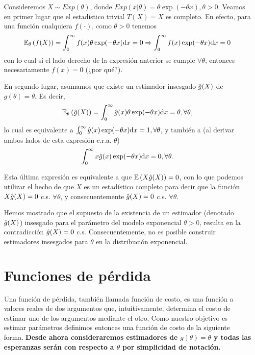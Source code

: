 \begin{example}
	\label{ex:estimador_exponancial}
	Consideremos $X\sim Exp(\theta)$, donde $Exp(x|\theta) = \theta\exp(-\theta x),\theta>0$. Veamos en primer lugar que el estadístico trivial $T(X) = X$ es completo. En efecto, para una función cualquiera $f(\cdot)$, como $\theta>0$ tenemos
	\begin{equation}
	    \mathbb{E}_\theta \left(f(X)\right) = \int_0^\infty f(x)\theta\exp(-\theta x){\text{d}} x = 0 \Rightarrow  \int_0^\infty f(x)\exp(-\theta x){\text{d}} x = 0
	\end{equation}
	con lo cual si el lado derecho de la expresión anterior se cumple  $\forall \theta$, entonces necesariamente $f(x)=0$ (¿por qué?).
	
	En segundo lugar, asumamos que existe un estimador insesgado ${ \hat{g}(X)}$ de $g(\theta) = \theta$. Es decir, 
	\begin{equation}
	\nonumber
		\mathbb{E}_\theta \left({ \hat{g}(X)}\right) = \int_0^\infty { \hat{g}(x)}\theta\exp(-\theta x){\text{d}} x = \theta, \forall \theta,
	\end{equation}
	lo cual es equivalente a $\int_0^\infty { \hat{g}(x)}\exp(-\theta x){\text{d}} x = 1, \forall \theta$, y también a (al derivar ambos lados de esta expresión c.r.a. $\theta$) 
	\begin{equation}
	    \int_0^\infty x{ \hat{g}(x)}\exp(-\theta x){\text{d}} x = 0, \forall \theta.
	\end{equation}

	Esta última expresión es equivalente a que $\mathbb{E} \left(X{ \hat{g}(X)}\right) = 0$, con lo que podemos utilizar el hecho de que $X$ es un estadístico completo para decir que la función $X{ \hat{g}(X)}=0$ c.s. $\forall \theta$, y consecuentemente ${ \hat{g}(X)}=0$ c.s. $\forall \theta$. 
	
	Hemos mostrado que el supuesto de la existencia de un estimador (denotado ${ \hat{g}(X)}$) insesgado para el parámetro del modelo exponencial $\theta>0$, resulta en la contradicción ${ \hat{g}(X)}=0$ c.s. Consecuentemente, no es posible construir estimadores insesgados para $\theta$ en la distribución exponencial.
\end{example}




\section{Funciones de pérdida}

Una función de pérdida, también llamada función de costo, es una función a valores reales de dos argumentos que, intuitivamente, determina el costo de estimar uno de los argumentos mediante el otro. Como nuestro objetivo es estimar parámetros definimos entonces una función de costo de la siguiente forma. \textbf{Desde ahora consideraremos estimadores de $g(\theta) = \theta$ y todas las esperanzas serán con respecto a $\theta$ por simplicidad de notación.}

